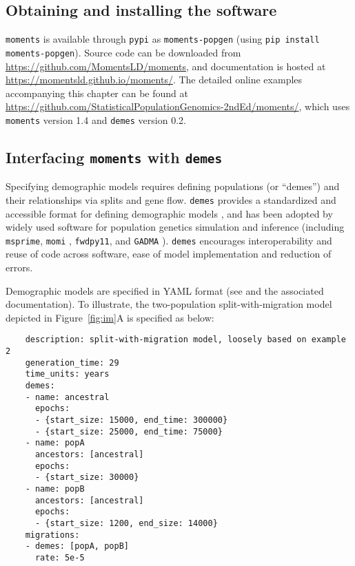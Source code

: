 \documentclass[]{article}
\newcommand{\moments}{\texttt{moments}\xspace}
\newcommand{\demes}{\texttt{demes}\xspace}
\newcommand{\msprime}{\texttt{msprime}\xspace}
\newcommand{\momi}{\texttt{momi}\xspace}
\newcommand{\fwdpy}{\texttt{fwdpy11}\xspace}
\begin{document}
\subsection*{Obtaining and installing the software}

\moments is available through \texttt{pypi} as \texttt{moments-popgen} (using
\texttt{pip install moments-popgen}). Source code can be downloaded from
\url{https://github.com/MomentsLD/moments}, and  documentation is hosted at
\url{https://momentsld.github.io/moments/}. The detailed online examples
accompanying this chapter can be found at
\url{https://github.com/StatisticalPopulationGenomics-2ndEd/moments/}, which uses
\moments version 1.4 and \demes version 0.2.

\subsection*{Interfacing \moments with \demes}

Specifying demographic models requires defining populations (or ``demes'') and
their relationships via splits and gene flow. \demes provides a standardized
and accessible format for defining demographic models \cite{gower2022demes},
and has been adopted by widely used software for population genetics simulation
and inference (including \msprime \cite{baumdicker2022efficient}, \momi
\cite{dilber2024faster}, \fwdpy \cite{thornton2019polygenic}, and
\texttt{GADMA} \cite{noskova2023gadma2}). \demes encourages interoperability
and reuse of code across software, ease of model implementation and reduction
of errors.

Demographic models are specified in YAML format (see \cite{gower2022demes} and
the associated documentation). To illustrate, the two-population
split-with-migration model depicted in Figure~\ref{fig:im}A is specified as
below:

\singlespacing
\begin{verbatim}
    description: split-with-migration model, loosely based on example 2
    generation_time: 29
    time_units: years
    demes:
    - name: ancestral
      epochs:
      - {start_size: 15000, end_time: 300000}
      - {start_size: 25000, end_time: 75000}
    - name: popA
      ancestors: [ancestral]
      epochs:
      - {start_size: 30000}
    - name: popB
      ancestors: [ancestral]
      epochs:
      - {start_size: 1200, end_size: 14000}
    migrations:
    - demes: [popA, popB]
      rate: 5e-5
\end{verbatim}
\doublespacing
\end{document}
